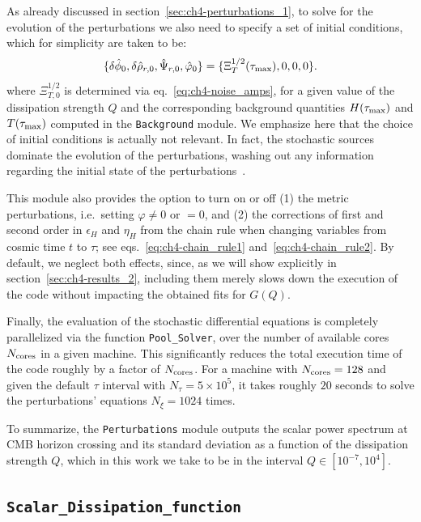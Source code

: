 As already discussed in section~\ref{sec:ch4-perturbations_1}, to solve for the evolution of the perturbations we also need to specify a set of initial conditions, which for simplicity are taken to be:
\begin{equation}
  \{\delta\hat{\phi}_0,\delta\hat{\rho}_{r,0},\hat{\Psi}_{r,0},\hat{\varphi}_0\}=\{\Xi_{T}^{1/2}(\tau_{\rm{max}}),0,0,0 \}.  
\end{equation}
where $\Xi_{T,0}^{1/2}$ is determined via eq.~\eqref{eq:ch4-noise_amps}, for a given value of the dissipation strength $Q$ and the corresponding background quantities $H(\tau_{\rm{max}})$ and $T(\tau_{\rm{max}})$ computed in the \texttt{Background} module. We emphasize here that the choice of initial conditions is actually not relevant. In fact, the stochastic sources dominate the evolution of the perturbations, washing out any information regarding the initial state of the perturbations~\cite{Bastero-Gil:2011rva,Ballesteros:2022hjk}.

This module also provides the option to turn on or off (1) the metric perturbations, i.e.\ setting $\varphi\neq0$ or $=0$, and (2) the corrections of first and second order in $\epsilon_H$ and $\eta_H$ from the chain rule when changing variables from cosmic time $t$ to $\tau$; see eqs.~\eqref{eq:ch4-chain_rule1} and~\eqref{eq:ch4-chain_rule2}. By default, we neglect both effects, since, as we will show explicitly in section~\ref{sec:ch4-results_2}, including them merely slows down the execution of the code without impacting the obtained fits for $G(Q)$.

Finally, the evaluation of the stochastic differential equations is completely parallelized via the function \texttt{Pool\_Solver}, over the number of available cores $N_{\rm cores}$ in a given machine. This significantly reduces the total execution time of the code roughly by a factor of $N_{\rm cores}$. For a machine with $N_{\rm{cores}}=128$ and given the default $\tau$ interval with $N_{\tau}=5\times10^{5}$, it takes roughly $20$ seconds to solve the perturbations' equations $N_\xi=1024$ times.

To summarize, the \texttt{Perturbations} module outputs the scalar power spectrum at CMB horizon crossing and its standard deviation as a function of the dissipation strength $Q$, which in this work we take to be in the interval $Q\in [10^{-7},10^{4}]$.

\subsection{\texttt{Scalar\_Dissipation\_function}}

